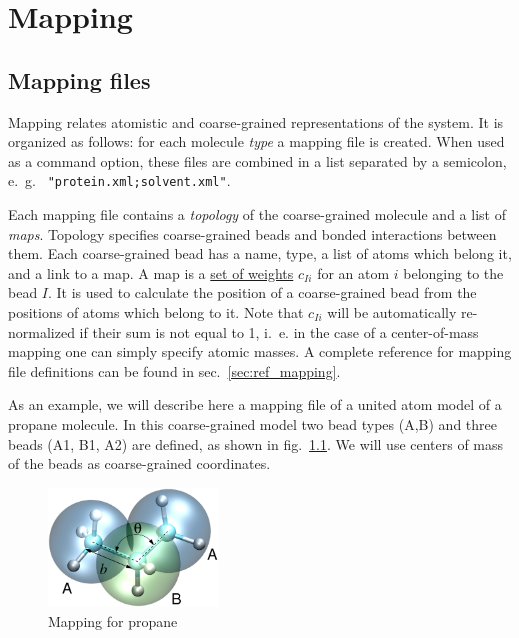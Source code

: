 \chapter{Mapping}
\label{sec:mapping}

\section{Mapping files}
Mapping relates atomistic and coarse-grained representations of the system. It is organized as follows: for each molecule {\em type} a mapping file is created. When used as a command option, these files are combined in a list separated by a semicolon, e.~g. ~\texttt{"protein.xml;solvent.xml"}.

Each mapping file contains a {\em topology} of the coarse-grained molecule and a list of {\em maps}. Topology specifies coarse-grained beads and bonded interactions between them. Each coarse-grained bead has a name, type, a list of atoms which belong it, and a link to a map. A map is a \hyperref[sec:mapping_operator]{set of weights} $c_{Ii}$ for an atom $i$ belonging to the bead $I$. It is used to calculate the position of a coarse-grained bead from the positions of atoms which belong to it. Note that $c_{Ii}$ will be automatically re-normalized if their sum is not equal to 1, i.~e. in the case of a center-of-mass mapping one can simply specify atomic masses.
A complete reference for mapping file definitions can be found in sec.~\ref{sec:ref_mapping}.

As an example, we will describe here a mapping file of a united atom model of a propane molecule. In this coarse-grained model two bead types (A,B) and three beads (A1, B1, A2) are defined, as shown in fig.~\ref{fig:propane_map}. We will use centers of mass of the beads as  coarse-grained coordinates.


\begin{figure}[ht]
  \includegraphics[width=0.4\textwidth]{functionality/fig/propane.eps}
  \caption{Mapping for propane
  \label{fig:propane_map}
}
\end{figure}

